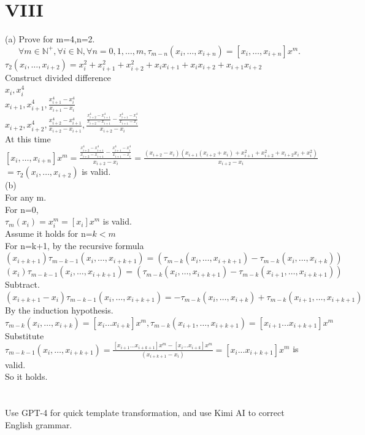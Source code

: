 \documentclass[a4paper]{article}
\begin{document}
\section*{VIII}
(a)
Prove for m=4,n=2.\\
\[
\forall m \in \mathbb{N}^+, \forall i \in \mathbb{N}, \forall n = 0, 1, \ldots, m,
\tau_{m-n}(x_i, \ldots, x_{i+n}) = [x_i, \ldots, x_{i+n}]x^m.
\]
$\tau_{2}(x_i, \ldots, x_{i+2})=x_i^2+x_{i+1}^2+x_{i+2}^2+x_ix_{i+1}+x_ix_{i+2}+x_{i+1}x_{i+2} $\\
Construct divided difference\\
$x_i,x_i^4$\\
$x_{i+1},x_{i+1}^4,\frac{x_{i+1}^4-x_{i}^4}{x_{i+1}-x_i}$\\
$x_{i+2},x_{i+2}^4,\frac{x_{i+2}^4-x_{i+1}^4}{x_{i+2}-x_{i+1}},\frac{\frac{x_{i+2}^4-x_{i+1}^4}{x_{i+2}-x_{i+1}}-\frac{x_{i+1}^4-x_{i}^4}{x_{i+1}-x_i}}{x_{i+2}-x_i}$ \\
At this time $[x_i, \ldots, x_{i+n}]x^m=\frac{\frac{x_{i+2}^4-x_{i+1}^4}{x_{i+2}-x_{i+1}}-\frac{x_{i+1}^4-x_{i}^4}{x_{i+1}-x_i}}{x_{i+2}-x_i}=\frac{(x_{i+2}-x_i)(x_{i+1}(x_{i+2}+x_{i})+x_{i+1}^2+x_{i+2}^2+x_{i+2}x_{i}+x_i^2)}{x_{i+2}-x_{i}}$\\
$=\tau_{2}(x_i, \ldots, x_{i+2})$ is valid.\\
(b)\\
For any m.\\
For n=0,\\
$\tau_{m}(x_i)=x_i^{m}=[x_i]x^{m}$ is valid.\\
Assume it holds for n=$k<m$\\
For n=k+1, by the recursive formula\\
$(x_{i+k+1})\tau_{m-k-1}(x_i, \ldots, x_{i+k+1})=(\tau_{m-k}(x_{i}, \ldots, x_{i+k+1})-\tau_{m-k}(x_i, \ldots, x_{i+k}))$\\
$(x_{i})\tau_{m-k-1}(x_i, \ldots, x_{i+k+1})=(\tau_{m-k}(x_{i}, \ldots, x_{i+k+1})-\tau_{m-k}(x_{i+1}, \ldots, x_{i+k+1}))$
Subtract.\\
$(x_{i+k+1}-x_i)\tau_{m-k-1}(x_i, \ldots, x_{i+k+1})=-\tau_{m-k}(x_i, \ldots, x_{i+k})+\tau_{m-k}(x_{i+1}, \ldots, x_{i+k+1})$\\
By the induction hypothesis.\\
$\tau_{m-k}(x_i, \ldots, x_{i+k})=[x_i...x_{i+k}]x^m,\tau_{m-k}(x_{i+1}, \ldots, x_{i+k+1})=[x_{i+1}...x_{i+k+1}]x^m$\\
Substitute
$\tau_{m-k-1}(x_i, \ldots, x_{i+k+1})=\frac{[x_{i+1}...x_{i+k+1}]x^m-[x_i...x_{i+k}]x^m}{(x_{i+k+1}-x_i)}=[x_i...x_{i+k+1}]x^m$ is valid.\\
So it holds.\\


\section*{  }
Use GPT-4 for quick template transformation, and use Kimi AI to correct English grammar.
\end{document}

